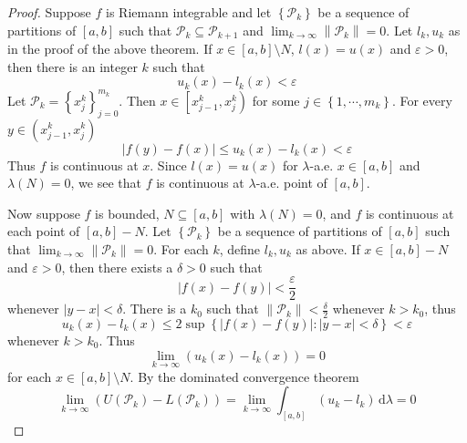 \documentclass[../main.tex]{subfiles}
\begin{document}
\begin{proof}
    Suppose \(  f   \) is Riemann integrable and let \(  \left\{ \mathcal{P}_{k} \right\}  \) be a sequence of partitions of \(  \left[ a,b \right]   \) such that \(  \mathcal{P}_{k}\subseteq \mathcal{P}_{k+ 1}  \) and \(  \lim_{k\to \infty}\left\| \mathcal{P}_{k} \right\|= 0  \).     Let \(  l_{k},u_{k}   \) as in the proof of the above theorem. If \(  x \in \left[ a,b \right]\setminus N   \), \(  l\left( x \right)= u\left( x \right)    \) and \(   \varepsilon > 0  \), then there is an integer \(  k  \) such that \[
    u_{k}\left( x \right)-l_{k}\left( x \right)<  \varepsilon   
    \]Let \(  \mathcal{P}_{k}= \left\{ x_{j}^{k} \right\}_{j= 0}^{m_{k}}  \). Then \(  x\in \left[ x_{j-1}^{k},x_{j}^{k} \right)   \) for some \(  j\in \left\{  1,\cdots,m _{k} \right\}  \). For every \(  y \in \left( x_{j-1}^{k},x_{j}^{k} \right)   \) \[
    \left| f\left( y \right)-f\left( x \right)   \right|\le u_{k}\left( x \right)-l_{k}\left( x \right)<  \varepsilon    
    \]Thus \(  f  \) is continuous at \(  x  \). Since \(  l\left( x \right)= u\left( x \right)    \) for \(   \lambda   \)-a.e. \(  x\in \left[ a,b \right]   \) and \(   \lambda \left( N \right)= 0   \), we see that \(  f  \) is continuous at \(   \lambda   \)-a.e. point of \(  \left[ a,b \right]   \).
    
    Now suppose \(  f  \) is bounded, \(  N\subseteq \left[ a,b \right]   \) with \(   \lambda \left( N \right)= 0   \), and \(  f  \) is continuous at each point of \(  \left[ a,b \right]-N   \). Let \(  \left\{ \mathcal{P}_{k} \right\}  \) be a sequence of partitions of \(  \left[ a,b \right]   \) such that \(  \lim_{k\to \infty}\left\| \mathcal{P}_{k} \right\|= 0  \). For each \(  k  \), define \(  l_{k},u_{k}  \) as above. If \(  x\in \left[ a,b \right]-N   \) and \(   \varepsilon > 0  \), then there exists a \(   \delta > 0  \) such that \[
    \left| f\left( x \right)-f\left( y \right)   \right|< \frac{ \varepsilon  }{2 }  
    \]whenever \(  \left| y-x \right|<  \delta    \). There is a \(  k_0  \) such that \(  \left\| \mathcal{P}_{k} \right\|< \frac{ \delta  }{2 }   \) whenever \(  k> k_0  \), thus \[
    u_{k}\left( x \right)-l_{k}\left( x \right)\le 2\sup \left\{ \left| f\left( x \right)-f\left( y \right)   \right|:\left| y-x \right|<  \delta    \right\}  <  \varepsilon  
    \] whenever \(  k> k_0  \). Thus \[
    \lim_{k\to \infty}\left( u_{k}\left( x \right)-l_{k}\left( x \right)   \right)= 0 
    \] for each \(  x\in \left[ a,b \right]\setminus N   \). By the dominated convergence theorem \[
    \lim_{k\to \infty}\left( U\left( \mathcal{P}_{k} \right)-L\left( \mathcal{P}_{k} \right)   \right)= \lim_{k\to \infty} \int_{\left[ a,b \right] }\left( u_{k}-l_{k} \right)\,\mathrm{d}  \lambda = 0  
    \]                   
\end{proof}
\end{document}
